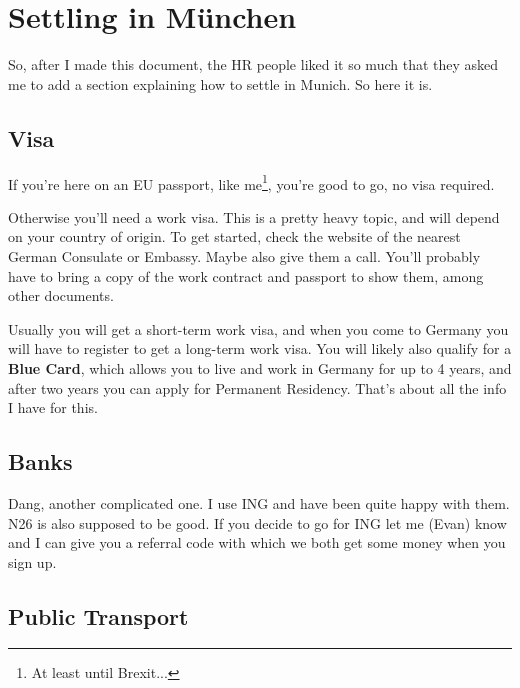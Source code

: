 \documentclass[11pt]{report}
\begin{document}
\chapter{Settling in M\"unchen}
So, after I made this document, the HR people liked it so much that they asked me to add a section explaining how to settle in Munich. So here it is.

\section{Visa}
If you're here on an EU passport, like me\footnote{At least until Brexit...}, you're good to go, no visa required.

Otherwise you'll need a work visa. This is a pretty heavy topic, and will depend on your country of origin. To get started, check the website of the nearest German Consulate or Embassy. Maybe also give them a call. You'll probably have to bring a copy of the work contract and passport to show them, among other documents.

Usually you will get a short-term work visa, and when you come to Germany you will have to register to get a long-term work visa. You will likely also qualify for a \textbf{Blue Card}, which allows you to live and work in Germany for up to 4 years, and after two years you can apply for Permanent Residency. That's about all the info I have for this.

\section{Banks}
Dang, another complicated one. I use ING and have been quite happy with them. N26 is also supposed to be good. If you decide to go for ING let me (Evan) know and I can give you a referral code with which we both get some money when you sign up.

\section{Public Transport}
\end{document}
